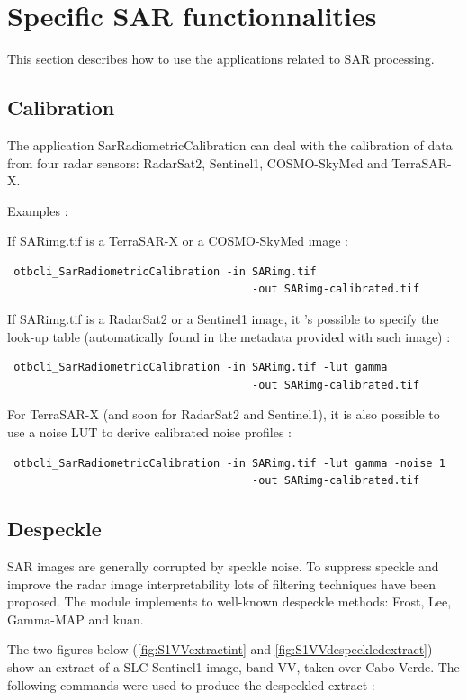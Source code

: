 \newpage
\section{Specific SAR functionnalities}

This section describes how to use the applications related to SAR processing.

\subsection{Calibration}

The application SarRadiometricCalibration can deal with the calibration of data from four radar sensors:
RadarSat2, Sentinel1, COSMO-SkyMed and TerraSAR-X.

Examples :

If SARimg.tif is a TerraSAR-X or a COSMO-SkyMed image :

\begin{verbatim} otbcli_SarRadiometricCalibration -in SARimg.tif
									  -out SARimg-calibrated.tif \end{verbatim}
									  
If SARimg.tif is a RadarSat2 or a Sentinel1 image, it 's possible to specify the look-up table 
(automatically found in the metadata provided with such image) :

\begin{verbatim} otbcli_SarRadiometricCalibration -in SARimg.tif -lut gamma
									  -out SARimg-calibrated.tif \end{verbatim}

For TerraSAR-X (and soon for RadarSat2 and Sentinel1), it is also possible
to use a noise LUT to derive calibrated noise profiles :

\begin{verbatim} otbcli_SarRadiometricCalibration -in SARimg.tif -lut gamma -noise 1
									  -out SARimg-calibrated.tif \end{verbatim}

\subsection{Despeckle}
SAR images are generally corrupted by speckle noise. To suppress 
speckle and improve the radar image interpretability lots of filtering 
techniques have been proposed.  The module implements to well-known 
despeckle methods: Frost, Lee, Gamma-MAP and kuan.

The two figures below (\ref{fig:S1VVextractint} and \ref{fig:S1VVdespeckledextract}) show an extract of a SLC Sentinel1 image, band VV, taken over Cabo Verde.
The following commands were used to produce the despeckled extract :

